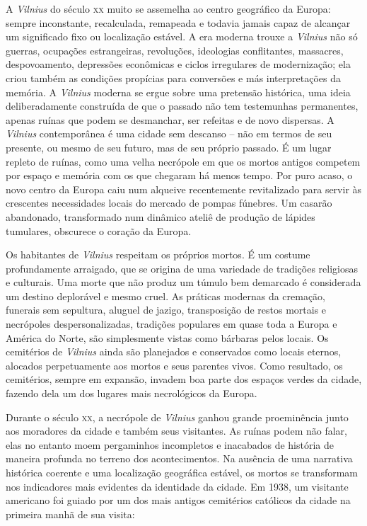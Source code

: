 A \textit{Vilnius} do século \textsc{xx} muito se assemelha ao centro geográfico da
Europa: sempre inconstante, recalculada, remapeada e todavia jamais
capaz de alcançar um significado fixo ou localização estável. A era
moderna trouxe a \textit{Vilnius} não só guerras, ocupações estrangeiras,
revoluções, ideologias conflitantes, massacres, despovoamento,
depressões econômicas e ciclos irregulares de modernização; ela criou
também as condições propícias para conversões e más interpretações da
memória. A \textit{Vilnius} moderna se ergue sobre uma pretensão histórica, uma
ideia deliberadamente construída de que o passado não tem testemunhas
permanentes, apenas ruínas que podem se desmanchar, ser refeitas e de
novo dispersas. A \textit{Vilnius} contemporânea é uma cidade sem descanso -- não
em termos de seu presente, ou mesmo de seu futuro, mas de seu próprio
passado. É um lugar repleto de ruínas, como uma velha necrópole em que
os mortos antigos competem por espaço e memória com os que chegaram há
menos tempo. Por puro acaso, o novo centro da Europa caiu num alqueive
recentemente revitalizado para servir às crescentes necessidades locais
do mercado de pompas fúnebres. Um casarão abandonado, transformado num
dinâmico ateliê de produção de lápides tumulares, obscurece o coração da
Europa.

Os habitantes de \textit{Vilnius} respeitam os próprios mortos. É um
costume profundamente arraigado, que se origina de uma variedade de
tradições religiosas e culturais. Uma morte que não produz um túmulo bem
demarcado é considerada um destino deplorável e mesmo cruel. As práticas
modernas da cremação, funerais sem sepultura, aluguel de jazigo,
transposição de restos mortais e necrópoles despersonalizadas, tradições
populares em quase toda a Europa e América do Norte, são simplesmente
vistas como bárbaras pelos locais. Os cemitérios de \textit{Vilnius} ainda são
planejados e conservados como locais eternos, alocados perpetuamente aos
mortos e seus parentes vivos. Como resultado, os cemitérios, sempre em
expansão, invadem boa parte dos espaços verdes da cidade, fazendo dela
um dos lugares mais necrológicos da Europa.

Durante o século \textsc{xx}, a necrópole de \textit{Vilnius} ganhou grande proeminência
junto aos moradores da cidade e também seus visitantes. As ruínas podem
não falar, elas no entanto moem pergaminhos incompletos e inacabados de
história de maneira profunda no terreno dos acontecimentos. Na ausência
de uma narrativa histórica coerente e uma localização geográfica
estável, os mortos se transformam nos indicadores mais evidentes da
identidade da cidade. Em 1938, um visitante americano foi guiado por um
dos mais antigos cemitérios católicos da cidade na primeira manhã de sua
visita:

